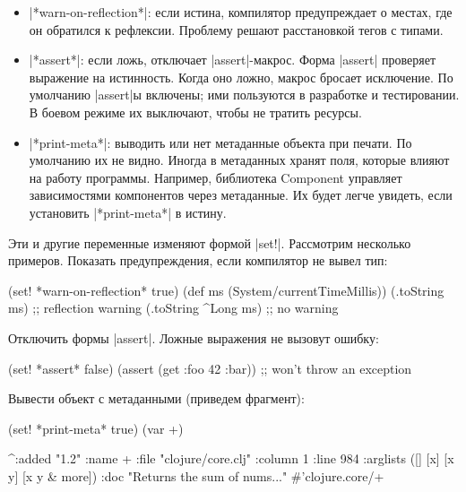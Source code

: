 \begin{itemize}

\item
  \spverb|*warn-on-reflection*|: если истина, компилятор предупреждает о местах,
  где он обратился к рефлексии. Проблему решают расстановкой тегов с типами.

\item
  \spverb|*assert*|: если ложь, отключает \spverb|assert|-макрос. Форма
  \spverb|assert| проверяет выражение на истинность. Когда оно ложно, макрос
  бросает исключение.  По умолчанию \spverb|assert|ы включены; ими пользуются в
  разработке и тестировании. В боевом режиме их выключают, чтобы не тратить
  ресурсы.

\item
  \spverb|*print-meta*|: выводить или нет метаданные объекта при печати. По
  умолчанию их не видно. Иногда в метаданных хранят поля, которые влияют на
  работу программы. Например, библиотека Component управляет зависимостями
  компонентов через метаданные. Их будет легче увидеть, если установить
  \spverb|*print-meta*| в истину.

\end{itemize}

Эти и другие переменные изменяют формой \spverb|set!|. Рассмотрим несколько
примеров. Показать предупреждения, если компилятор не вывел тип:

\begin{english}
  \begin{clojure}
(set! *warn-on-reflection* true)
(def ms (System/currentTimeMillis))
(.toString ms)       ;; reflection warning
(.toString ^Long ms) ;; no warning
  \end{clojure}
\end{english}

\noindent
Отключить формы \spverb|assert|. Ложные выражения не вызовут ошибку:

\begin{english}
  \begin{clojure}
(set! *assert* false)
(assert (get {:foo 42} :bar))
;; won't throw an exception
  \end{clojure}
\end{english}

\noindent
Вывести объект с метаданными (приведем фрагмент):

\begin{english}
  \begin{clojure}
(set! *print-meta* true)
(var +)

^{:added "1.2"
  :name +
  :file "clojure/core.clj"
  :column 1
  :line 984
  :arglists ([] [x] [x y] [x y & more])
  :doc "Returns the sum of nums..."}
#'clojure.core/+
  \end{clojure}
\end{english}

